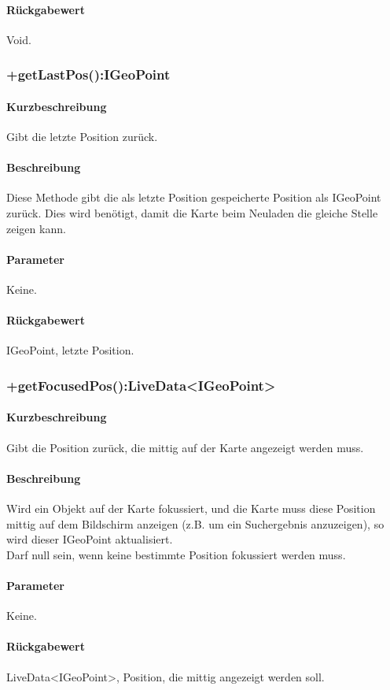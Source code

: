 \paragraph*{Rückgabewert}
Void.

\subsubsection{+getLastPos():IGeoPoint}%
\paragraph*{Kurzbeschreibung}
Gibt die letzte Position zurück.
\paragraph*{Beschreibung}
Diese Methode gibt die als letzte Position gespeicherte Position als IGeoPoint zurück.
Dies wird benötigt, damit die Karte beim Neuladen die gleiche Stelle zeigen kann.
\paragraph*{Parameter}
Keine.
\paragraph*{Rückgabewert}
IGeoPoint, letzte Position.

\subsubsection{+getFocusedPos():LiveData<IGeoPoint>}%
\paragraph*{Kurzbeschreibung}
Gibt die Position zurück, die mittig auf der Karte angezeigt werden muss.
\paragraph*{Beschreibung}
Wird ein Objekt auf der Karte fokussiert, und die Karte muss diese Position mittig auf dem 
Bildschirm anzeigen (z.B. um ein Suchergebnis anzuzeigen), so wird dieser IGeoPoint aktualisiert.\\
Darf null sein, wenn keine bestimmte Position fokussiert werden muss.
\paragraph*{Parameter}
Keine.
\paragraph*{Rückgabewert}
LiveData<IGeoPoint>, Position, die mittig angezeigt werden soll.

